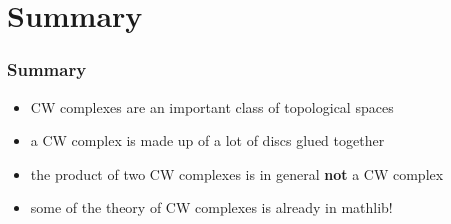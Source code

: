 \documentclass{beamer}
\begin{document}
\section{Summary}

\begin{frame}
\frametitle{Summary}
\begin{itemize}
  \item[\textbullet] CW complexes are an important class of topological spaces 
  \pause
  \item[\textbullet] a CW complex is made up of a lot of discs glued together
  \pause
  \item[\textbullet] the product of two CW complexes is in general \textbf{not} a CW complex 
  \pause
  \item[\textbullet] some of the theory of CW complexes is already in mathlib! 
\end{itemize}
\end{frame}
\end{document}

